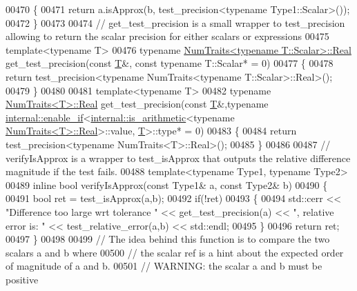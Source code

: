 \begin{DoxyCode}
00470 \{
00471   \textcolor{keywordflow}{return} a.isApprox(b, test\_precision<typename Type1::Scalar>());
00472 \}
00473 
00474 \textcolor{comment}{// get\_test\_precision is a small wrapper to test\_precision allowing to return the scalar precision for
       either scalars or expressions}
00475 \textcolor{keyword}{template}<\textcolor{keyword}{typename} T>
00476 \textcolor{keyword}{typename} \hyperlink{group___sparse_core___module}{NumTraits<typename T::Scalar>::Real} get\_test\_precision(\textcolor{keyword}{const} 
      \hyperlink{group___sparse_core___module}{T}&, \textcolor{keyword}{const} \textcolor{keyword}{typename} T::Scalar* = 0)
00477 \{
00478   \textcolor{keywordflow}{return} test\_precision<typename NumTraits<typename T::Scalar>::Real>();
00479 \}
00480 
00481 \textcolor{keyword}{template}<\textcolor{keyword}{typename} T>
00482 \textcolor{keyword}{typename} \hyperlink{group___sparse_core___module}{NumTraits<T>::Real} get\_test\_precision(\textcolor{keyword}{const} \hyperlink{group___sparse_core___module}{T}&,\textcolor{keyword}{typename} 
      \hyperlink{struct_eigen_1_1internal_1_1enable__if}{internal::enable\_if}<\hyperlink{struct_eigen_1_1internal_1_1is__arithmetic}{internal::is\_arithmetic}<\textcolor{keyword}{typename} 
      \hyperlink{group___sparse_core___module}{NumTraits<T>::Real}>::value, \hyperlink{group___sparse_core___module}{T}>::type* = 0)
00483 \{
00484   \textcolor{keywordflow}{return} test\_precision<typename NumTraits<T>::Real>();
00485 \}
00486 
00487 \textcolor{comment}{// verifyIsApprox is a wrapper to test\_isApprox that outputs the relative difference magnitude if the test
       fails.}
00488 \textcolor{keyword}{template}<\textcolor{keyword}{typename} Type1, \textcolor{keyword}{typename} Type2>
00489 \textcolor{keyword}{inline} \textcolor{keywordtype}{bool} verifyIsApprox(\textcolor{keyword}{const} Type1& a, \textcolor{keyword}{const} Type2& b)
00490 \{
00491   \textcolor{keywordtype}{bool} ret = test\_isApprox(a,b);
00492   \textcolor{keywordflow}{if}(!ret)
00493   \{
00494     std::cerr << \textcolor{stringliteral}{"Difference too large wrt tolerance "} << get\_test\_precision(a)  << \textcolor{stringliteral}{", relative error is: "}
       << test\_relative\_error(a,b) << std::endl;
00495   \}
00496   \textcolor{keywordflow}{return} ret;
00497 \}
00498 
00499 \textcolor{comment}{// The idea behind this function is to compare the two scalars a and b where}
00500 \textcolor{comment}{// the scalar ref is a hint about the expected order of magnitude of a and b.}
00501 \textcolor{comment}{// WARNING: the scalar a and b must be positive}

\end{DoxyCode}
